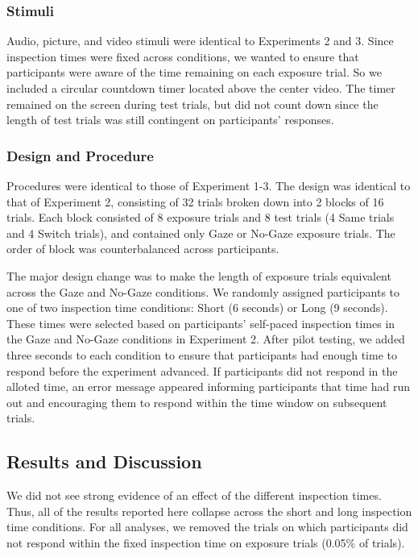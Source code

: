 \documentclass[authoryear, review]{elsarticle}
\begin{document}
\subsubsection{Stimuli}\label{stimuli-2}

Audio, picture, and video stimuli were identical to Experiments 2 and 3.
Since inspection times were fixed across conditions, we wanted to ensure
that participants were aware of the time remaining on each exposure
trial. So we included a circular countdown timer located above the
center video. The timer remained on the screen during test trials, but
did not count down since the length of test trials was still contingent
on participants' responses.

\subsubsection{Design and Procedure}\label{design-and-procedure-3}

Procedures were identical to those of Experiment 1-3. The design was
identical to that of Experiment 2, consisting of 32 trials broken down
into 2 blocks of 16 trials. Each block consisted of 8 exposure trials
and 8 test trials (4 Same trials and 4 Switch trials), and contained
only Gaze or No-Gaze exposure trials. The order of block was
counterbalanced across participants.

The major design change was to make the length of exposure trials
equivalent across the Gaze and No-Gaze conditions. We randomly assigned
participants to one of two inspection time conditions: Short (6 seconds)
or Long (9 seconds). These times were selected based on participants'
self-paced inspection times in the Gaze and No-Gaze conditions in
Experiment 2. After pilot testing, we added three seconds to each
condition to ensure that participants had enough time to respond before
the experiment advanced. If participants did not respond in the alloted
time, an error message appeared informing participants that time had run
out and encouraging them to respond within the time window on subsequent
trials.

\subsection{Results and Discussion}\label{results-and-discussion-3}

We did not see strong evidence of an effect of the different inspection
times. Thus, all of the results reported here collapse across the short
and long inspection time conditions. For all analyses, we removed the
trials on which participants did not respond within the fixed inspection
time on exposure trials (0.05\% of trials).
\end{document}
